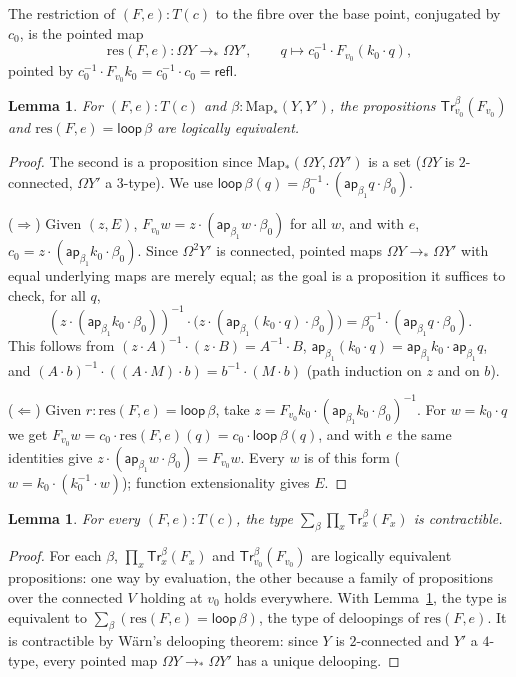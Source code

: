 \documentclass[11pt]{amsart}
\newtheorem{lemma}[theorem]{Lemma}
\theoremstyle{definition}
\theoremstyle{remark}
\newcommand{\Om}{\Omega}
\newcommand{\refl}{\mathsf{refl}}
\newcommand{\ap}{\mathsf{ap}}
\newcommand{\Map}{\mathrm{Map}_*}
\newcommand{\lp}{\mathsf{loop}}
\newcommand{\Tl}{\mathsf{Tr}}
\begin{document}
The restriction of $(F,e):T(c)$ to the fibre over the base point, conjugated
by $c_0$, is the pointed map
\[\mathrm{res}(F,e):\Om Y\to_*\Om Y',\qquad q\mapsto c_0^{-1}\cdot F_{v_0}(k_0\cdot q),\]
pointed by $c_0^{-1}\cdot F_{v_0}k_0=c_0^{-1}\cdot c_0=\refl$.

\begin{lemma}\label{lem:atpt}
For $(F,e):T(c)$ and $\beta:\Map(Y,Y')$, the propositions
$\Tl^\beta_{v_0}(F_{v_0})$ and $\mathrm{res}(F,e)=\lp\,\beta$ are logically
equivalent.
\end{lemma}
\begin{proof}
The second is a proposition since $\Map(\Om Y,\Om Y')$ is a set ($\Om Y$ is
$2$-connected, $\Om Y'$ a $3$-type). We use
$\lp\,\beta(q)=\beta_0^{-1}\cdot(\ap_{\beta_1}q\cdot\beta_0)$.

($\Rightarrow$) Given $(z,E)$, $F_{v_0}w=z\cdot(\ap_{\beta_1}w\cdot\beta_0)$ for
all $w$, and with $e$, $c_0=z\cdot(\ap_{\beta_1}k_0\cdot\beta_0)$. Since
$\Om^2Y'$ is connected, pointed maps $\Om Y\to_*\Om Y'$ with equal underlying
maps are merely equal; as the goal is a proposition it suffices to check, for
all $q$,
\[(z\cdot(\ap_{\beta_1}k_0\cdot\beta_0))^{-1}\cdot\big(z\cdot(\ap_{\beta_1}(k_0\cdot q)\cdot\beta_0)\big)
=\beta_0^{-1}\cdot(\ap_{\beta_1}q\cdot\beta_0).\]
This follows from $(z\cdot A)^{-1}\cdot(z\cdot B)=A^{-1}\cdot B$,
$\ap_{\beta_1}(k_0\cdot q)=\ap_{\beta_1}k_0\cdot\ap_{\beta_1}q$, and
$(A\cdot b)^{-1}\cdot((A\cdot M)\cdot b)=b^{-1}\cdot(M\cdot b)$ (path induction on
$z$ and on $b$).

($\Leftarrow$) Given $r:\mathrm{res}(F,e)=\lp\,\beta$, take
$z=F_{v_0}k_0\cdot(\ap_{\beta_1}k_0\cdot\beta_0)^{-1}$. For $w=k_0\cdot q$ we get
$F_{v_0}w=c_0\cdot\mathrm{res}(F,e)(q)=c_0\cdot\lp\,\beta(q)$, and with $e$ the same
identities give $z\cdot(\ap_{\beta_1}w\cdot\beta_0)=F_{v_0}w$. Every $w$ is of
this form ($w=k_0\cdot(k_0^{-1}\cdot w)$); function extensionality gives $E$.
\end{proof}

\begin{lemma}\label{lem:unique}
For every $(F,e):T(c)$, the type $\sum_\beta\prod_x\Tl^\beta_x(F_x)$ is
contractible.
\end{lemma}
\begin{proof}
For each $\beta$, $\prod_x\Tl^\beta_x(F_x)$ and $\Tl^\beta_{v_0}(F_{v_0})$ are
logically equivalent propositions: one way by evaluation, the other because a
family of propositions over the connected $V$ holding at $v_0$ holds
everywhere. With Lemma~\ref{lem:atpt}, the type is equivalent to
$\sum_\beta(\mathrm{res}(F,e)=\lp\,\beta)$, the type of deloopings of
$\mathrm{res}(F,e)$. It is contractible by Wärn's delooping theorem: since $Y$ is
$2$-connected and $Y'$ a $4$-type, every pointed map $\Om Y\to_*\Om Y'$ has a
unique delooping.
\end{proof}
\end{document}
